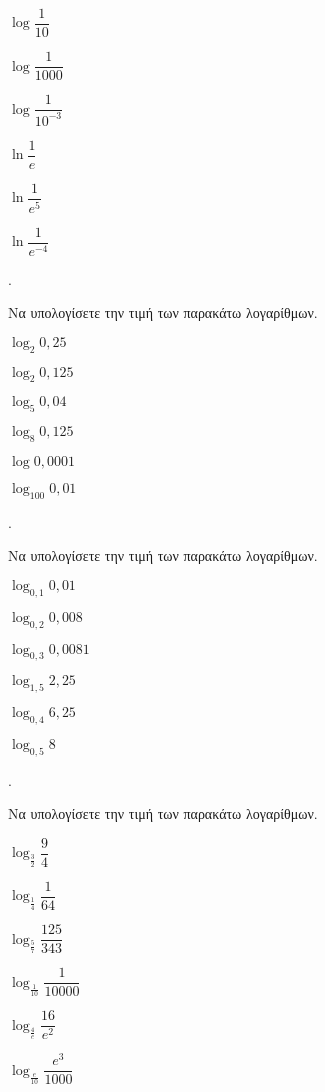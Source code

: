 \documentclass[11pt,a4paper,twocolumn]{article}
\newcounter{askhsh}
\newcommand{\askhsh}{{\large\theaskhsh.}\ \addtocounter{askhsh}{1}}
\begin{document}
\begin{multicols}{3}
\begin{alist}
\item $ \log{\dfrac{1}{10}} $
\item $ \log{\dfrac{1}{1000}} $
\item $ \log{\dfrac{1}{10^{-3}}} $
\item $ \ln{\dfrac{1}{e}} $
\item $ \ln{\dfrac{1}{e^5}} $
\item $ \ln{\dfrac{1}{e^{-4}}} $
\end{alist}
\end{multicols}
\askhsh Να υπολογίσετε την τιμή των παρακάτω λογαρίθμων.
\begin{multicols}{3}
\begin{alist}
\item $ \log_{2}{0{,}25} $
\item $ \log_{2}{0{,}125} $
\item $ \log_{5}{0{,}04} $
\item $ \log_{8}{0{,}125} $
\item $ \log{0{,}0001} $
\item $ \log_{100}{0{,}01} $
\end{alist}
\end{multicols}
\askhsh Να υπολογίσετε την τιμή των παρακάτω λογαρίθμων.
\begin{multicols}{3}
\begin{alist}[leftmargin=4mm]
\item $ \log_{0{,}1}{0{,}01} $
\item $ \log_{0{,}2}{0{,}008} $
\item $ \log_{0{,}3}{0{,}0081} $
\item $ \log_{1{,}5}{2{,}25} $
\item $ \log_{0{,}4}{6{,}25} $
\item $ \log_{0{,}5}{8} $
\end{alist}
\end{multicols}
\askhsh Να υπολογίσετε την τιμή των παρακάτω λογαρίθμων.
\begin{multicols}{3}
\begin{alist}[leftmargin=4mm]
\item $ \log_{\frac{3}{2}}{\dfrac{9}{4}} $
\item $ \log_{\frac{1}{4}}{\dfrac{1}{64}} $
\item $ \log_{\frac{5}{7}}{\dfrac{125}{343}} $
\item $ \log_{\frac{1}{10}}{\dfrac{1}{10000}} $
\item $ \log_{\frac{4}{e}}{\dfrac{16}{e^2}} $
\item $ \log_{\frac{e}{10}}{\dfrac{e^3}{1000}} $
\end{alist}
\end{multicols}
\end{document}
